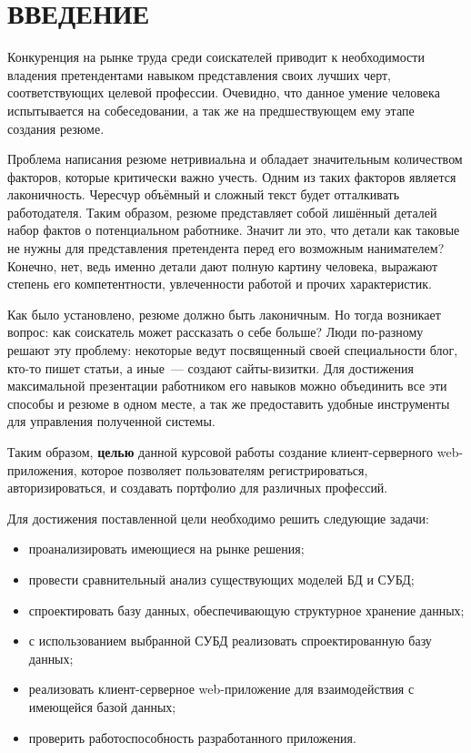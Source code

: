 \chapter*{\hfill{}ВВЕДЕНИЕ\hfill{}}%
\label{cha:vvedenie}

Конкуренция на рынке труда среди соискателей приводит к необходимости владения претендентами навыком представления своих лучших черт, соответствующих целевой профессии. Очевидно, что данное умение человека испытывается на собеседовании, а так же на предшествующем ему этапе создания резюме.

Проблема написания резюме нетривиальна и обладает значительным количеством факторов, которые критически важно учесть. Одним из таких факторов является лаконичность. Чересчур объёмный и сложный текст будет отталкивать работодателя. Таким образом, резюме представляет собой лишённый деталей набор фактов о потенциальном работнике. Значит ли это, что детали как таковые не нужны для представления претендента перед его возможным нанимателем? Конечно, нет, ведь именно детали дают полную картину человека, выражают степень его компетентности, увлеченности работой и прочих характеристик.

Как было установлено, резюме должно быть лаконичным. Но тогда возникает вопрос: как соискатель может рассказать о себе больше? Люди по-разному решают эту проблему: некоторые ведут посвященный своей специальности блог, кто-то пишет статьи, а иные~--- создают сайты-визитки. Для достижения максимальной презентации работником его навыков можно объединить все эти способы и резюме в одном месте, а так же предоставить удобные инструменты для управления полученной системы.

Таким образом, \textbf{целью} данной курсовой работы создание клиент-серверного web-приложения, которое позволяет пользователям регистрироваться, авторизироваться, и создавать портфолио для различных профессий.

Для достижения поставленной цели необходимо решить следующие задачи:
\begin{itemize}
    \item проанализировать имеющиеся на рынке решения;
    \item провести сравнительный анализ существующих моделей БД и СУБД;
    \item спроектировать базу данных, обеспечивающую структурное хранение данных;
    \item с использованием выбранной СУБД реализовать спроектированную базу данных;
    \item реализовать клиент-серверное web-приложение для взаимодействия с имеющейся базой данных;
    \item проверить работоспособность разработанного приложения.
\end{itemize}
